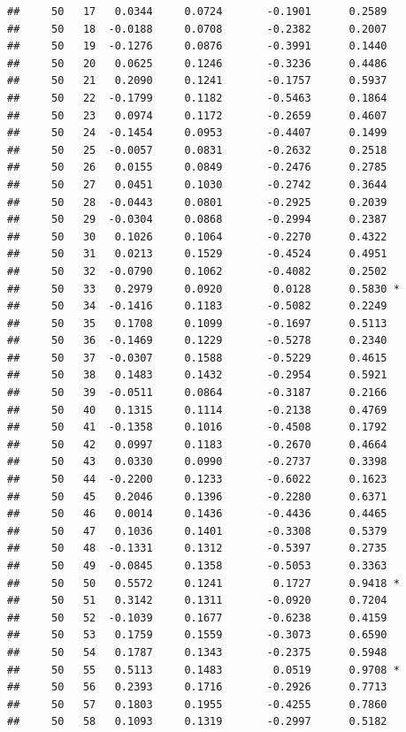 \documentclass[
]{article}
\begin{document}
\begin{verbatim}
##     50   17   0.0344     0.0724       -0.1901      0.2589  
##     50   18  -0.0188     0.0708       -0.2382      0.2007  
##     50   19  -0.1276     0.0876       -0.3991      0.1440  
##     50   20   0.0625     0.1246       -0.3236      0.4486  
##     50   21   0.2090     0.1241       -0.1757      0.5937  
##     50   22  -0.1799     0.1182       -0.5463      0.1864  
##     50   23   0.0974     0.1172       -0.2659      0.4607  
##     50   24  -0.1454     0.0953       -0.4407      0.1499  
##     50   25  -0.0057     0.0831       -0.2632      0.2518  
##     50   26   0.0155     0.0849       -0.2476      0.2785  
##     50   27   0.0451     0.1030       -0.2742      0.3644  
##     50   28  -0.0443     0.0801       -0.2925      0.2039  
##     50   29  -0.0304     0.0868       -0.2994      0.2387  
##     50   30   0.1026     0.1064       -0.2270      0.4322  
##     50   31   0.0213     0.1529       -0.4524      0.4951  
##     50   32  -0.0790     0.1062       -0.4082      0.2502  
##     50   33   0.2979     0.0920        0.0128      0.5830 *
##     50   34  -0.1416     0.1183       -0.5082      0.2249  
##     50   35   0.1708     0.1099       -0.1697      0.5113  
##     50   36  -0.1469     0.1229       -0.5278      0.2340  
##     50   37  -0.0307     0.1588       -0.5229      0.4615  
##     50   38   0.1483     0.1432       -0.2954      0.5921  
##     50   39  -0.0511     0.0864       -0.3187      0.2166  
##     50   40   0.1315     0.1114       -0.2138      0.4769  
##     50   41  -0.1358     0.1016       -0.4508      0.1792  
##     50   42   0.0997     0.1183       -0.2670      0.4664  
##     50   43   0.0330     0.0990       -0.2737      0.3398  
##     50   44  -0.2200     0.1233       -0.6022      0.1623  
##     50   45   0.2046     0.1396       -0.2280      0.6371  
##     50   46   0.0014     0.1436       -0.4436      0.4465  
##     50   47   0.1036     0.1401       -0.3308      0.5379  
##     50   48  -0.1331     0.1312       -0.5397      0.2735  
##     50   49  -0.0845     0.1358       -0.5053      0.3363  
##     50   50   0.5572     0.1241        0.1727      0.9418 *
##     50   51   0.3142     0.1311       -0.0920      0.7204  
##     50   52  -0.1039     0.1677       -0.6238      0.4159  
##     50   53   0.1759     0.1559       -0.3073      0.6590  
##     50   54   0.1787     0.1343       -0.2375      0.5948  
##     50   55   0.5113     0.1483        0.0519      0.9708 *
##     50   56   0.2393     0.1716       -0.2926      0.7713  
##     50   57   0.1803     0.1955       -0.4255      0.7860  
##     50   58   0.1093     0.1319       -0.2997      0.5182  

\end{verbatim}
\end{document}

